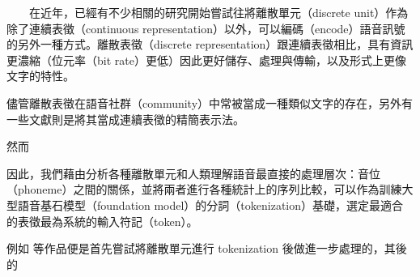 
　　在近年，已經有不少相關的研究開始嘗試往將離散單元（discrete unit）作為除了連續表徵（continuous representation）以外，可以編碼（encode）語音訊號的另外一種方式。離散表徵（discrete representation）跟連續表徵相比，具有資訊更濃縮（位元率（bit rate）更低）因此更好儲存、處理與傳輸，以及形式上更像文字的特性。

    儘管離散表徵在語音社群（community）中常被當成一種類似文字的存在，另外有一些文獻則是將其當成連續表徵的精簡表示法。

    然而

    因此，我們藉由分析各種離散單元和人類理解語音最直接的處理層次：音位（phoneme）之間的關係，並將兩者進行各種統計上的序列比較，可以作為訓練大型語音基石模型（foundation model）的分詞（tokenization）基礎，選定最適合的表徵最為系統的輸入符記（token）。

    例如 \cite{wu2023wav2seq} 等作品便是首先嘗試將離散單元進行 tokenization 後做進一步處理的，其後的



